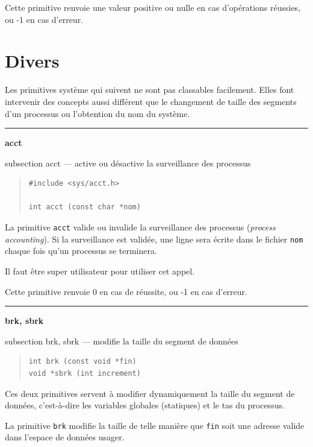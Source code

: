 \documentclass [twoside] {report}
\newcommand {\primitive} [1]
    {
	\phantomsection
	{\large \textbf {#1}}
	\addcontentsline {toc} {subsection} {#1}
    }
\newcommand {\separation}
    {
	\vspace {5mm}
	\nopagebreak
	\hrule
    }
\begin{document}
Cette primitive renvoie une valeur positive ou nulle en cas
d'opérations réussies, ou -1 en cas d'erreur.



\section {Divers}


Les primitives système qui suivent ne sont pas
classables facilement. Elles font intervenir des
concepts aussi différent que le changement de
taille des segments d'un processus ou l'obtention
du nom du système.




\separation
\primitive {acct} --- active ou désactive la surveillance des processus

\begin {quote}
\begin {verbatim}
#include <sys/acct.h>

int acct (const char *nom)
\end{verbatim}
\end {quote}

La primitive \texttt {acct} valide ou invalide la
surveillance des processus (\textit {process
accounting}). Si la surveillance est validée, une
ligne sera écrite dans le fichier \texttt {nom} chaque
fois qu'un processus se terminera.

Il faut être super utilisateur pour utiliser cet
appel.

Cette primitive renvoie 0 en cas de réussite, ou
-1 en cas d'erreur.




\separation
\primitive {brk, sbrk} --- modifie la taille du segment de données

\begin {quote}
\begin {verbatim}
int brk (const void *fin)
void *sbrk (int increment)
\end{verbatim}
\end {quote}

Ces deux primitives servent à modifier dynamiquement la taille du
segment de données, c'est-à-dire les variables globales (statiques) et
le tas du processus.

La primitive \texttt {brk} modifie la taille de telle manière que \texttt {fin}
soit une adresse valide dans l'espace de données usager.
\end{document}
